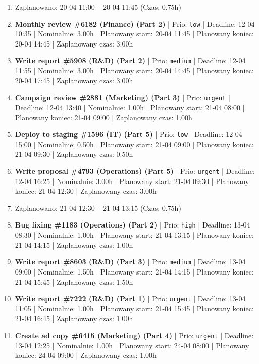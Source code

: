 {\begin{enumerate}
  \item [\textbf{PRZERWA}] Zaplanowano: 20-04 11:00 -- 20-04 11:45 (Czas: 0.75h)
  \item [\textbf{14690}] \textbf{Monthly review \#6182 (Finance) (Part 2)} | Prio: \texttt{low} | Deadline: 12-04 10:35 | Nominalnie: 3.00h | Planowany start: 20-04 11:45 | Planowany koniec: 20-04 14:45 | Zaplanowany czas: 3.00h
  \item [\textbf{14674}] \textbf{Write report \#5908 (R\&D) (Part 2)} | Prio: \texttt{medium} | Deadline: 12-04 11:55 | Nominalnie: 3.00h | Planowany start: 20-04 14:45 | Planowany koniec: 20-04 17:45 | Zaplanowany czas: 3.00h
  \item [\textbf{14599}] \textbf{Campaign review \#2881 (Marketing) (Part 3)} | Prio: \texttt{urgent} | Deadline: 12-04 13:40 | Nominalnie: 1.00h | Planowany start: 21-04 08:00 | Planowany koniec: 21-04 09:00 | Zaplanowany czas: 1.00h
  \item [\textbf{14692}] \textbf{Deploy to staging \#1596 (IT) (Part 5)} | Prio: \texttt{low} | Deadline: 12-04 15:00 | Nominalnie: 0.50h | Planowany start: 21-04 09:00 | Planowany koniec: 21-04 09:30 | Zaplanowany czas: 0.50h
  \item [\textbf{14600}] \textbf{Write proposal \#4793 (Operations) (Part 5)} | Prio: \texttt{urgent} | Deadline: 12-04 16:25 | Nominalnie: 3.00h | Planowany start: 21-04 09:30 | Planowany koniec: 21-04 12:30 | Zaplanowany czas: 3.00h
  \item [\textbf{PRZERWA}] Zaplanowano: 21-04 12:30 -- 21-04 13:15 (Czas: 0.75h)
  \item [\textbf{14613}] \textbf{Bug fixing \#1183 (Operations) (Part 2)} | Prio: \texttt{high} | Deadline: 13-04 08:30 | Nominalnie: 1.00h | Planowany start: 21-04 13:15 | Planowany koniec: 21-04 14:15 | Zaplanowany czas: 1.00h
  \item [\textbf{14634}] \textbf{Write report \#8603 (R\&D) (Part 3)} | Prio: \texttt{medium} | Deadline: 13-04 09:00 | Nominalnie: 1.50h | Planowany start: 21-04 14:15 | Planowany koniec: 21-04 15:45 | Zaplanowany czas: 1.50h
  \item [\textbf{14601}] \textbf{Write report \#7222 (R\&D) (Part 1)} | Prio: \texttt{urgent} | Deadline: 13-04 11:05 | Nominalnie: 1.00h | Planowany start: 21-04 15:45 | Planowany koniec: 21-04 16:45 | Zaplanowany czas: 1.00h
  \item [\textbf{14602}] \textbf{Create ad copy \#6415 (Marketing) (Part 4)} | Prio: \texttt{urgent} | Deadline: 13-04 12:25 | Nominalnie: 1.00h | Planowany start: 24-04 08:00 | Planowany koniec: 24-04 09:00 | Zaplanowany czas: 1.00h

\end{enumerate}}
